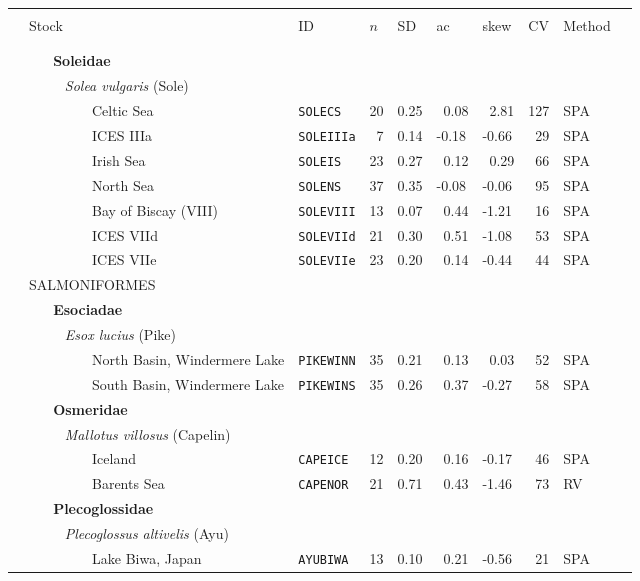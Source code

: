 \newpage
\begin{flushleft}
\begin{tabular*}{7.1in}{llllllllll} 
\hline \\ 
&{\normalsize Stock}&{\normalsize ID}&{\normalsize $n$}&{\normalsize SD}&{\normalsize ac}&{\normalsize skew}&{\normalsize CV}&{\normalsize Method}  & \\ 
 &&&&&&&&&\\ 
  \hline  &&&&&&&&&\\ 
&{\bf~~~Soleidae}&~&~&~&~&~&~&~  & \\ 
&{\it~~~~~Solea vulgaris} (Sole)&~&~&~&~&~&~&~  & \\ 
&~~~~~~~~~Celtic Sea&{\tt SOLECS}&20&0.25&~0.08&~2.81&127&SPA  & \\ 
&~~~~~~~~~ICES IIIa&{\tt SOLEIIIa}&~7&0.14&-0.18&-0.66&~29&SPA  & \\ 
&~~~~~~~~~Irish Sea&{\tt SOLEIS}&23&0.27&~0.12&~0.29&~66&SPA  & \\ 
&~~~~~~~~~North Sea&{\tt SOLENS}&37&0.35&-0.08&-0.06&~95&SPA  & \\ 
&~~~~~~~~~Bay of Biscay (VIII)&{\tt SOLEVIII}&13&0.07&~0.44&-1.21&~16&SPA  & \\ 
&~~~~~~~~~ICES VIId&{\tt SOLEVIId}&21&0.30&~0.51&-1.08&~53&SPA  & \\ 
&~~~~~~~~~ICES VIIe&{\tt SOLEVIIe}&23&0.20&~0.14&-0.44&~44&SPA  & \\ 
&{\normalsize SALMONIFORMES}&~&~&~&~&~&~&~  & \\ 
&{\bf~~~Esociadae}&~&~&~&~&~&~&~  & \\ 
&{\it~~~~~Esox lucius} (Pike)&~&~&~&~&~&~&~  & \\ 
&~~~~~~~~~North Basin, Windermere Lake&{\tt PIKEWINN}&35&0.21&~0.13&~0.03&~52&SPA  & \\ 
&~~~~~~~~~South Basin, Windermere Lake&{\tt PIKEWINS}&35&0.26&~0.37&-0.27&~58&SPA  & \\ 
&{\bf~~~Osmeridae}&~&~&~&~&~&~&~  & \\ 
&{\it~~~~~Mallotus villosus} (Capelin)&~&~&~&~&~&~&~  & \\ 
&~~~~~~~~~Iceland&{\tt CAPEICE}&12&0.20&~0.16&-0.17&~46&SPA  & \\ 
&~~~~~~~~~Barents Sea&{\tt CAPENOR}&21&0.71&~0.43&-1.46&~73&RV  & \\ 
&{\bf~~~Plecoglossidae}&~&~&~&~&~&~&~  & \\ 
&{\it~~~~~Plecoglossus altivelis} (Ayu)&~&~&~&~&~&~&~  & \\ 
&~~~~~~~~~Lake Biwa, Japan&{\tt AYUBIWA}&13&0.10&~0.21&-0.56&~21&SPA  & \\ 

\end{tabular*}
\end{flushleft}
